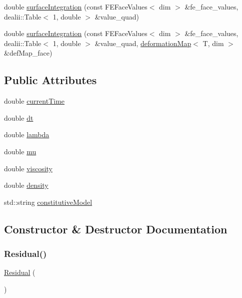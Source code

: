 \begin{DoxyCompactItemize}
\item 
double \mbox{\hyperlink{class_residual_a454c4fd90cd46e3108e3d76eccbf2075}{surface\+Integration}} (const F\+E\+Face\+Values$<$ dim $>$ \&fe\+\_\+face\+\_\+values, dealii\+::\+Table$<$ 1, double $>$ \&value\+\_\+quad)
\item 
double \mbox{\hyperlink{class_residual_a8c32782b660888461d7b8f8a728b2751}{surface\+Integration}} (const F\+E\+Face\+Values$<$ dim $>$ \&fe\+\_\+face\+\_\+values, dealii\+::\+Table$<$ 1, double $>$ \&value\+\_\+quad, \mbox{\hyperlink{structdeformation_map}{deformation\+Map}}$<$ T, dim $>$ \&def\+Map\+\_\+face)
\end{DoxyCompactItemize}
\subsection*{Public Attributes}
\begin{DoxyCompactItemize}
\item 
double \mbox{\hyperlink{class_residual_a272038ad264893a568c808f13d818b17}{current\+Time}}
\item 
double \mbox{\hyperlink{class_residual_a03e28be41881b703c836edbfe9b51b17}{dt}}
\item 
double \mbox{\hyperlink{class_residual_a3db359547eed8cfd48ca821d95f577af}{lambda}}
\item 
double \mbox{\hyperlink{class_residual_a74577585cf12d1712ab9c57616d49205}{mu}}
\item 
double \mbox{\hyperlink{class_residual_ad80875e5d1c4362e2eae93663ad723fb}{viscosity}}
\item 
double \mbox{\hyperlink{class_residual_a6f8c052f8417728038991f7f2826d38d}{density}}
\item 
std\+::string \mbox{\hyperlink{class_residual_a83be21658f82b0682f84f5dc9f10190f}{constitutive\+Model}}
\end{DoxyCompactItemize}


\subsection{Constructor \& Destructor Documentation}
\mbox{\label{class_residual_a4b540ba8e3ad0a1f8cfe2b4acd20493b}} 
\subsubsection{\texorpdfstring{Residual()}{Residual()}}
{\footnotesize\ttfamily \mbox{\hyperlink{class_residual}{Residual}} (\begin{DoxyParamCaption}{ }\end{DoxyParamCaption})}


